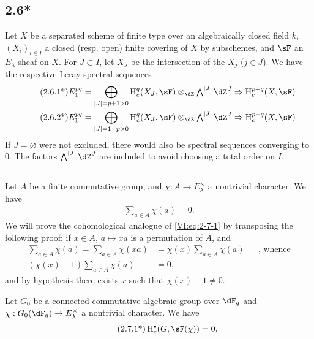 \subsection*{2.6*}\label{VI:2-6*}

Let $X$ be a separated scheme of finite type over an algebraically closed field $k$, 
$(X_i)_{i\in I}$ a closed (resp. open) finite covering of $X$ by 
subschemes, and $\sF$ an $E_\lambda$-sheaf on $X$. For $J\subset I$, 
let $X_J$ be the intersection of the $X_j$ ($j\in J$). We have the respective 
Leray spectral sequences 
\begin{align*}\tag{2.6.1*}\label{VI:eq:2-6-1*}
  E_1^{p q} &= \bigoplus_{|J|=p+1>0} \h_c^q(X_J,\sF) \otimes_\dZ \textstyle\bigwedge^{|J|} \dZ^J \Rightarrow \h_c^{p+q}(X,\sF) \\ 
  \tag{2.6.2*}\label{VI:eq:2-6-2*}
  E_1^{p q} &= \bigoplus_{|J|=1-p>0} \h_c^q(X_J,\sF) \otimes_\dZ \textstyle\bigwedge^{|J|} \dZ^J \Rightarrow \h_c^{p+q}(X,\sF)
\end{align*}
If $J=\varnothing$ were not excluded, there would also be spectral 
sequences converging to $0$. The factors $\bigwedge^{|J|} \dZ^J$ are included 
to avoid choosing a total order on $I$. 





\subsection{}\label{VI:2-7}

Let $A$ be a finite commutative group, and $\chi:A \to E_\lambda^\times$ a 
nontrivial character. We have 
\begin{align*}\tag{2.7.1}\label{VI:eq:2-7-1}
  \sum_{a\in A} \chi(a) = 0 \text{.}
\end{align*}
We will prove the cohomological analogue of \eqref{VI:eq:2-7-1} by transposing 
the following proof: if $x\in A$, $a\mapsto x a$ is a permutation of $A$, and 
\begin{align*}
  \sum_{a\in A}\chi(a) = \sum_{a\in A} \chi(x a) &= \chi(x) \sum_{a\in A} \chi(a) && \text{, whence} \\
  (\chi(x)-1)\sum_{a\in A}\chi(a) &= 0 \text{,}
\end{align*}
and by hypothesis there exists $x$ such that $\chi(x)-1\ne 0$. 





\begin{theorem*}[2.7*]\label{VI:2-7*}
Let $G_0$ be a connected commutative algebraic group over $\dF_q$ and 
$\chi:G_0(\dF_q) \to E_\lambda^\times$ a nontrivial character. We have 
\begin{align*}\tag{2.7.1*}\label{VI:eq:2-7-1*}
  \h_c^\bullet(G,\sF(\chi)) = 0 \text{.}
\end{align*}
\end{theorem*}

